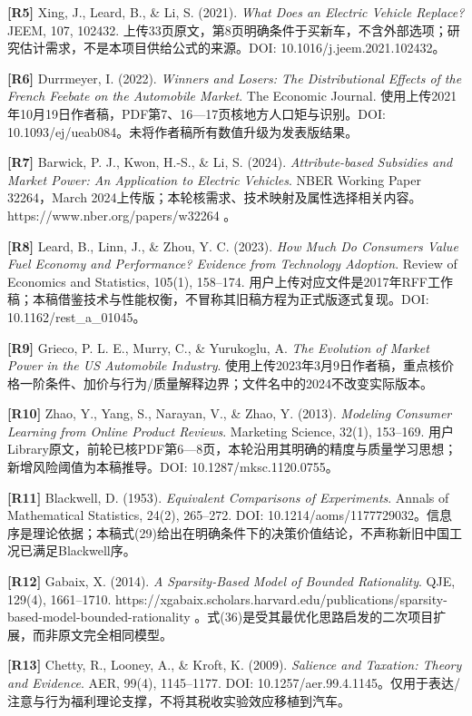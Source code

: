 \documentclass[
  11pt,
]{article}
\begin{document}
\textbf{{[}R5{]}} Xing, J., Leard, B., \& Li, S. (2021). \emph{What Does
an Electric Vehicle Replace?} JEEM, 107, 102432.
上传33页原文，第8页明确条件于买新车，不含外部选项；研究估计需求，不是本项目供给公式的来源。DOI:
10.1016/j.jeem.2021.102432。

\textbf{{[}R6{]}} Durrmeyer, I. (2022). \emph{Winners and Losers: The
Distributional Effects of the French Feebate on the Automobile Market}.
The Economic Journal.
使用上传2021年10月19日作者稿，PDF第7、16---17页核地方人口矩与识别。DOI:
10.1093/ej/ueab084。未将作者稿所有数值升级为发表版结果。

\textbf{{[}R7{]}} Barwick, P. J., Kwon, H.-S., \& Li, S. (2024).
\emph{Attribute-based Subsidies and Market Power: An Application to
Electric Vehicles}. NBER Working Paper 32264，March
2024上传版；本轮核需求、技术映射及属性选择相关内容。https://www.nber.org/papers/w32264
。

\textbf{{[}R8{]}} Leard, B., Linn, J., \& Zhou, Y. C. (2023). \emph{How
Much Do Consumers Value Fuel Economy and Performance? Evidence from
Technology Adoption}. Review of Economics and Statistics, 105(1),
158--174.
用户上传对应文件是2017年RFF工作稿；本稿借鉴技术与性能权衡，不冒称其旧稿方程为正式版逐式复现。DOI:
10.1162/rest\_a\_01045。

\textbf{{[}R9{]}} Grieco, P. L. E., Murry, C., \& Yurukoglu, A.
\emph{The Evolution of Market Power in the US Automobile Industry}.
使用上传2023年3月9日作者稿，重点核价格一阶条件、加价与行为/质量解释边界；文件名中的2024不改变实际版本。

\textbf{{[}R10{]}} Zhao, Y., Yang, S., Narayan, V., \& Zhao, Y. (2013).
\emph{Modeling Consumer Learning from Online Product Reviews}. Marketing
Science, 32(1), 153--169.
用户Library原文，前轮已核PDF第6---8页，本轮沿用其明确的精度与质量学习思想；新增风险阈值为本稿推导。DOI:
10.1287/mksc.1120.0755。

\textbf{{[}R11{]}} Blackwell, D. (1953). \emph{Equivalent Comparisons of
Experiments}. Annals of Mathematical Statistics, 24(2), 265--272. DOI:
10.1214/aoms/1177729032。信息序是理论依据；本稿式(29)给出在明确条件下的决策价值结论，不声称新旧中国工况已满足Blackwell序。

\textbf{{[}R12{]}} Gabaix, X. (2014). \emph{A Sparsity-Based Model of
Bounded Rationality}. QJE, 129(4), 1661--1710.
https://xgabaix.scholars.harvard.edu/publications/sparsity-based-model-bounded-rationality
。式(36)是受其最优化思路启发的二次项目扩展，而非原文完全相同模型。

\textbf{{[}R13{]}} Chetty, R., Looney, A., \& Kroft, K. (2009).
\emph{Salience and Taxation: Theory and Evidence}. AER, 99(4),
1145--1177. DOI:
10.1257/aer.99.4.1145。仅用于表达/注意与行为福利理论支撑，不将其税收实验效应移植到汽车。
\end{document}
